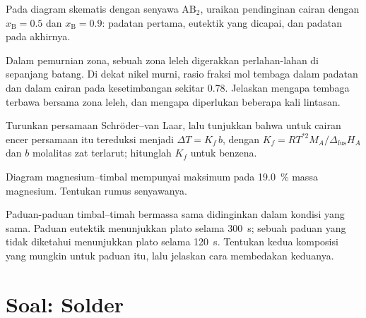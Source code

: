 \begin{exercise}[$\star\star$]\label{exo:b2:solid-liquid-diagrams:8}
Pada diagram skematis dengan senyawa $\mathrm{AB_2}$, uraikan pendinginan
cairan dengan $x_{\mathrm B} = 0.5$ dan $x_{\mathrm B} = 0.9$: padatan
pertama, eutektik yang dicapai, dan padatan pada akhirnya.
\end{exercise}

\begin{exercise}[$\star\star$]\label{exo:b2:solid-liquid-diagrams:9}
Dalam pemurnian zona, sebuah zona leleh digerakkan perlahan-lahan di
sepanjang batang. Di dekat nikel murni, rasio fraksi mol tembaga dalam
padatan dan dalam cairan pada kesetimbangan sekitar 0.78. Jelaskan
mengapa tembaga terbawa bersama zona leleh, dan mengapa diperlukan
beberapa kali lintasan.
\end{exercise}

\begin{exercise}[$\star\star\star$]\label{exo:b2:solid-liquid-diagrams:10}
Turunkan persamaan Schröder--van Laar, lalu tunjukkan bahwa untuk cairan
encer persamaan itu tereduksi menjadi $\Delta T = K_f\,b$, dengan
$K_f = RT^{*2}M_A/\Delta_{\text{fus}}H_A$ dan $b$ molalitas zat terlarut;
hitunglah $K_f$ untuk benzena.
\end{exercise}

\begin{exercise}[$\star\star\star$]\label{exo:b2:solid-liquid-diagrams:11}
Diagram magnesium--timbal mempunyai maksimum  pada 19.0~\% massa
magnesium. Tentukan rumus senyawanya.
\end{exercise}

\begin{exercise}[$\star\star\star$]\label{exo:b2:solid-liquid-diagrams:12}
Paduan-paduan timbal--timah bermassa sama didinginkan dalam kondisi yang
sama. Paduan eutektik menunjukkan plato selama \qty{300}{s}; sebuah paduan
yang tidak diketahui menunjukkan plato selama \qty{120}{s}. Tentukan kedua
komposisi yang mungkin untuk paduan itu, lalu jelaskan cara membedakan
keduanya.
\end{exercise}

\section{Soal: Solder}

